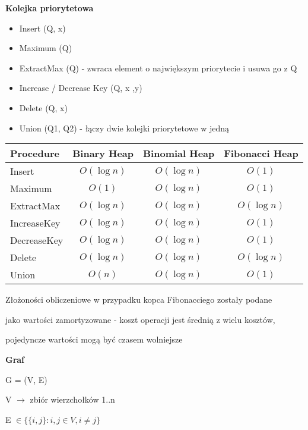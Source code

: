 \documentclass{article}
\begin{document}
\textbf{Kolejka priorytetowa} \par
\begin{itemize}
    \item Insert (Q, x)
    \item Maximum (Q)
    \item ExtractMax (Q) - zwraca element o największym priorytecie i usuwa go z Q
    \item Increase / Decrease Key (Q, x ,y)
    \item Delete (Q, x)
    \item Union (Q1, Q2) - łączy dwie kolejki priorytetowe w jedną
\end{itemize}

\begin{table}[H]
\centering
\begin{tabular}{lccc}
\toprule
\textbf{Procedure} & \textbf{Binary Heap} & \textbf{Binomial Heap} & \textbf{Fibonacci Heap} \\
\midrule
Insert        & $O(\log n)$ & $O(\log n)$ & $O(1)$      \\
Maximum       & $O(1)$      & $O(\log n)$ & $O(1)$      \\
ExtractMax    & $O(\log n)$ & $O(\log n)$ & $O(\log n)$ \\
IncreaseKey   & $O(\log n)$ & $O(\log n)$ & $O(1)$      \\
DecreaseKey   & $O(\log n)$ & $O(\log n)$ & $O(1)$      \\
Delete        & $O(\log n)$ & $O(\log n)$ & $O(\log n)$ \\
Union         & $O(n)$      & $O(\log n)$ & $O(1)$      \\
\bottomrule
\end{tabular}
\end{table}
\begin{center}
    Złożoności obliczeniowe w przypadku kopca Fibonacciego zostały podane \par
    jako wartości zamortyzowane - koszt operacji jest średnią z wielu kosztów, \par
    pojedyncze wartości mogą być czasem wolniejsze
\end{center}
\newpage
\begin{center}
    \textbf {Graf} \par
    \vspace{1\baselineskip}
    G = (V, E) \par
    V $\rightarrow$ zbiór wierzchołków {1..n} \par
    E $\in \{\{i, j\}: i,j \in V, i \neq j\}$ \par
\end{center} \par
\end{document}
